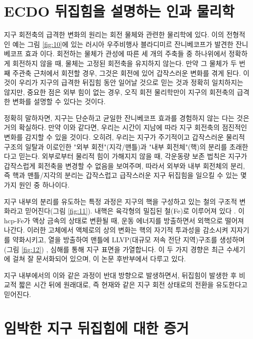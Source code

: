 \documentclass[10pt,twocolumn,letterpaper]{article}
\begin{document}
\section{ECDO 뒤집힘을 설명하는 인과 물리학}

지구 회전축의 급격한 변화의 원리는 회전 물체와 관련한 물리학에 있다. 이의 전형적인 예는  그림 \ref{fig:10}에 있는 러시아 우주비행사 블라디미르 잔니베코프가 발견한 잔니베코프 효과 \cite{37}이다. 회전하는 물체가 관성에 따른 세 개의 주축들 중 하나위에서 정확하게 회전하지 않을 때, 물체는 고정된 회전축을 유지하지 않는다. 만약 그 물체가  두 번째 주관축 근처에서 회전할 경우, 그것은 회전에 있어 갑작스러운 변화를 겪게 된다. 이것이 우리가 지구의 급격한 뒤집힘 동안 일어날 것으로 믿는 것과 정확히 일치하지는 않지만, 중요한 점은 외부 힘이 없는 경우, 오직 회전 물리학만이 지구의 회전축의 급격한 변화를 설명할 수 있다는 것이다.

정확히 말하자면, 지구는 단순하고 균일한 잔니베코프 효과를 경험하지 않는 다는 것은 거의 확실하다. 만약 이와 같다면, 우리는 시간이 지남에 따라 지구 회전축의 점진적인 변화를 감지할 수 있을 것이다. 오히려, 우리는 지구가 주기적이고 갑작스러운 물리적 구조의 일탈과 이로인한 "외부 회전"(지각/맨틀)과 "내부 회전체"(핵)의 분리를 초래한다고 믿는다. 외부로부터 물리적 힘이 가해지지 않을 때, 각운동량 보존 법칙은 지구가 갑작스럽게 회전축을 변경할 수 없음을 보여주며, 따라서 외부와 내부 회전체의 분리, 즉 핵과 맨틀/지각의 분리는 갑작스럽고 급작스러운 지구 뒤집힘을 일으킬 수 있는 몇 가지 원인 중 하나이다.

지구 내부의 분리를 유도하는 특정 과정은 지구의 핵을 구성하고 있는 철의 구조적 변화라고 믿어진다(그림 \ref{fig:11}). 내핵은 육각형의 밀집된 철(Fe)로 이루어져 있다 \cite{141}. 이 hcp-Fe가 액상 금속의  상태로 변환될 때,  운동 에너지를 방출하면서 외핵으로 떨어져 나간다. 이러한 고체에서 액체로의 상의 변화는 핵의 자기적 투과성을 감소시켜 지자기를 약화시키고, 열을 방출하여 맨틀에 LLVP(대규모 저속 전단 지역)구조를 생성하며(그림 \ref{fig:12}) \cite{38}, 심해를 통해 지구 표면을 가열합니다. 이 두 가지 경향은 최근 수세기에 걸쳐 잘 문서화되어 있으며, 이 논문 후반부에서 다루고 있다.

지구 내부에서의 이와 같은 과정이 반대 방향으로 발생하면서, 뒤집힘이 발생한 후 비교적 짧은 시간 뒤에 원래대로, 즉 현재와 같은 지구 회전 상태로의 전환을 유도한다고 믿어진다.

\section{임박한 지구 뒤집힘에 대한 증거}
\end{document}
